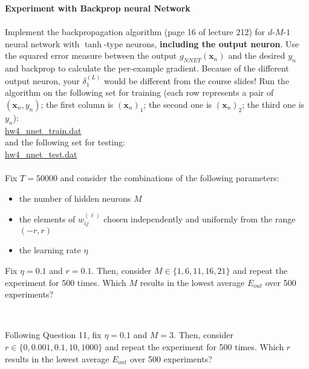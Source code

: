 \documentclass[a4paper,10pt]{exam}
\begin{document}
\begin{questions}
	   \question \textbf{Experiment with Backprop neural Network }\\
	   \\Implement the backpropagation algorithm (page 16 of lecture 212) for $d$-$M$-$1$ neural network with $\tanh$-type neurons, \textbf{including the output neuron}. Use the squared error measure between the output $g_{NNET}(\mathbf{x}_n)$ and the desired $y_n$ and backprop to calculate the per-example gradient. Because of the different output neuron, your $\delta_1^{(L)}$ would be different from the course slides! Run the algorithm on the following set for training (each row represents a pair of $(\mathbf{x}_n, y_n)$; the first column is $(\mathbf{x}_n)_1$; the second one is $(\mathbf{x}_n)_2$; the third one is $y_n$):\\
	   \href{https://d396qusza40orc.cloudfront.net/ntumltwo/hw4_data/hw4_nnet_train.dat}{hw4\_nnet\_train.dat}\\
	   and the following set for testing:\\
	   \href{https://d396qusza40orc.cloudfront.net/ntumltwo/hw4_data/hw4_nnet_test.dat}{hw4\_nnet\_test.dat}\\
	   \\Fix $T=50000$ and consider the combinations of the following parameters:
	   \begin{itemize}
	   	\item the number of hidden neurons $M$
	   	\item the elements of $w_{ij}^{(\ell)}$ chosen independently and uniformly from the range $(-r, r)$
	   	\item the learning rate $\eta$
	   \end{itemize}
	   Fix $\eta = 0.1$ and $r = 0.1$. Then, consider $M \in \{1, 6, 11, 16, 21\}$ and repeat the experiment for 500 times. Which $M$ results in the lowest average $E_{out}$ over 500 experiments?
	   \begin{checkboxes}
	   	 \\
	   \end{checkboxes}
	   
	   \question Following Question 11, fix $\eta = 0.1$ and $M=3$. Then, consider $r \in \{0, 0.001, 0.1, 10, 1000\}$ and repeat the experiment for 500 times. Which $r$ results in the lowest average $E_{out}$ over 500 experiments?
	   \begin{checkboxes}
	   	\choice 0
	   	\CorrectChoice 0.1
	   	\choice 0.001
	   	\choice 10
	   	\\
	   \end{checkboxes}
	   

\end{questions}
\end{document}
